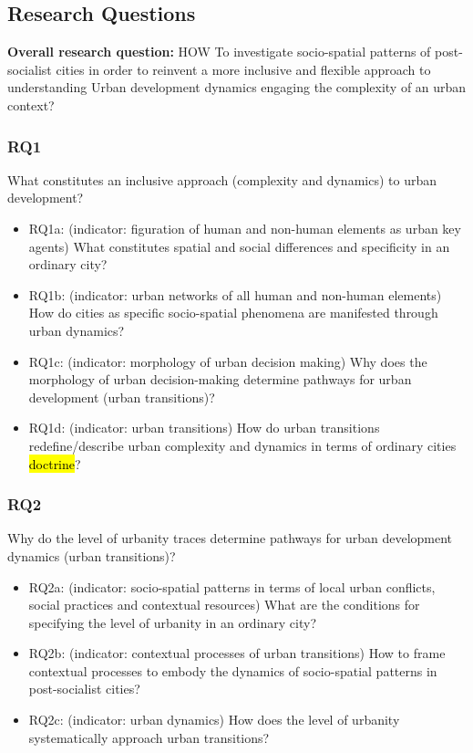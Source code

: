 \documentclass[11pt]{report}
\begin{document}
\subsection{Research Questions}
\textbf{Overall research question:} HOW To investigate socio-spatial patterns of post-socialist cities in order to reinvent a more inclusive and flexible approach to understanding Urban development dynamics engaging the complexity of an urban context? 

\subsubsection{RQ1}
What constitutes an inclusive approach (complexity and dynamics) to urban development?
\begin{itemize}
\item RQ1a: (indicator: figuration of human and non-human elements as urban key agents) What constitutes spatial and social differences and specificity in an ordinary city? 
\item RQ1b: (indicator: urban networks of all human and non-human elements) How do cities as specific socio-spatial phenomena are manifested through urban dynamics?
\item RQ1c: (indicator: morphology of urban decision making) Why does the morphology of urban decision-making determine pathways for urban development (urban transitions)?
\item RQ1d: (indicator: urban transitions) How do urban transitions redefine/describe urban complexity and dynamics in terms of ordinary cities \hl{doctrine}?
\end {itemize}

\subsubsection{RQ2}
Why do the level of urbanity traces determine pathways for urban development dynamics (urban transitions)? 
\begin{itemize}
\item RQ2a: (indicator: socio-spatial patterns in terms of local urban conflicts, social practices and contextual resources) What are the conditions for specifying the level of urbanity in an ordinary city?
\item RQ2b: (indicator: contextual processes of urban transitions) How to frame contextual processes to embody the dynamics of socio-spatial patterns in post-socialist cities?
\item RQ2c: (indicator: urban dynamics) How does the level of urbanity systematically approach urban transitions?
\end {itemize}
\end{document}
